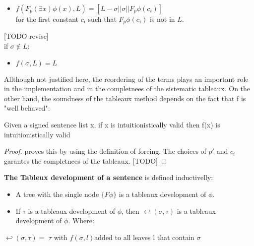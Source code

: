 \documentclass[runningheads]{llncs}
\begin{document}
\begin{definition}
\begin{itemize}
            \item $f(F_{p} (\exists x) \phi(x), L) = [L - \sigma|| \sigma || F_{p} \phi(c_i) ]$\\ for the first constant $c_i$ such that $F_{p} \phi(c_i)$ is not in $L$.
        \end{itemize} [TODO revise]\\
    if $\sigma \notin L$:
    \begin{itemize}
         \item $f(\sigma,L) = L $
    \end{itemize}
\end{definition}


Allthough not justified here, the reordering of the terms plays an important role in the implementation and in the completnees of the sistematic tableaux. On the other hand, 
the soundness of the tableaux method depends on the fact that f is "well behaved":
\begin{theorem}
    Given a signed sentence list x, if x is intuitionistically valid then f(x) is intuitionistically valid 
\end{theorem}
\begin{proof}
    \cite{book1} proves this by using the definition of forcing. The choices of $p'$ and $c_i$ garantes the completnees of the tableaux.
     [TODO]
\end{proof}


\begin{definition}
    \textbf{The Tableux development of a sentence } is defined inductivelly: 
    \begin{itemize}
        \item A tree with the single node $\{F \phi \}$ is a tableaux development of $\phi$. 
        \item If $\tau$ is a tableaux development of $\phi$, then $\hookleftarrow(\sigma,\tau)$ is a tableaux development of $\phi$. Where:
    \end{itemize}

    $\hookleftarrow(\sigma,\tau) = $ $\tau$ with $f(\sigma, l) $added to all leaves l that contain $\sigma$

\end{definition}
\end{document}
